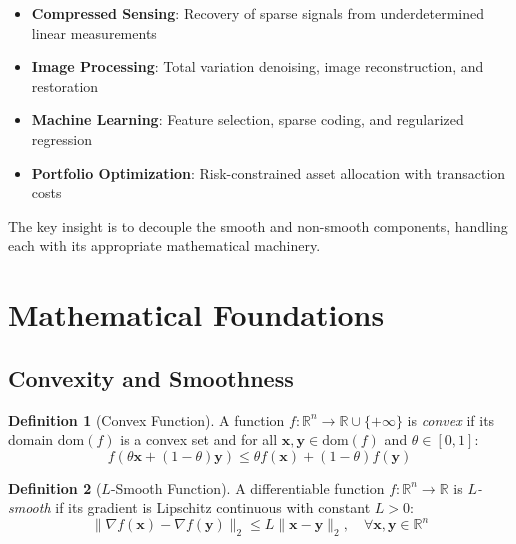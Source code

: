 \documentclass[12pt]{article}
\renewcommand{\vec}[1]{\mathbf{#1}}
\newcommand{\norm}[1]{\lVert #1 \rVert}
\newcommand{\R}{\mathbb{R}}
\theoremstyle{definition}
\newtheorem{definition}{Definition}[section]
\begin{document}
\begin{itemize}[leftmargin=*]
    \item \textbf{Compressed Sensing}: Recovery of sparse signals from underdetermined linear measurements
    \item \textbf{Image Processing}: Total variation denoising, image reconstruction, and restoration
    \item \textbf{Machine Learning}: Feature selection, sparse coding, and regularized regression
    \item \textbf{Portfolio Optimization}: Risk-constrained asset allocation with transaction costs
\end{itemize}

The key insight is to decouple the smooth and non-smooth components, handling each with its appropriate mathematical machinery.

\newpage
\section{Mathematical Foundations}

\subsection{Convexity and Smoothness}

\begin{definition}[Convex Function]
    A function $f: \R^n \to \R \cup \{+\infty\}$ is \textit{convex} if its domain $\text{dom}(f)$ is a convex set and for all $\vec{x}, \vec{y} \in \text{dom}(f)$ and $\theta \in [0,1]$:
    \begin{equation}
        f(\theta\vec{x} + (1-\theta)\vec{y}) \leq \theta f(\vec{x}) + (1-\theta)f(\vec{y})
    \end{equation}
\end{definition}

\begin{definition}[$L$-Smooth Function]\label{def:smooth}
    A differentiable function $f: \R^n \to \R$ is \textit{$L$-smooth} if its gradient is Lipschitz continuous with constant $L > 0$:
    \begin{equation}
        \norm{\nabla f(\vec{x}) - \nabla f(\vec{y})}_2 \leq L\norm{\vec{x} - \vec{y}}_2, \quad \forall \vec{x}, \vec{y} \in \R^n
    \end{equation}
\end{definition}
\end{document}

